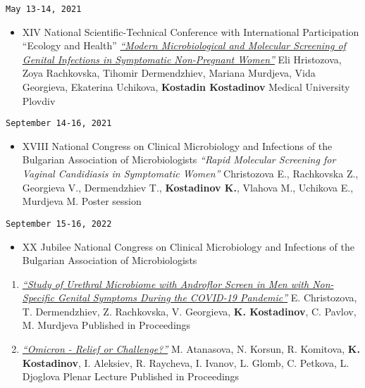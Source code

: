 \documentclass[
  12pt,
  letterpaper,
  DIV=11,
  numbers=noendperiod]{scrartcl}
\providecommand{\tightlist}{%
  \setlength{\itemsep}{0pt}\setlength{\parskip}{0pt}}\usepackage{longtable,booktabs,array}
\begin{document}
\texttt{May\ 13-14,\ 2021}

\begin{itemize}
\tightlist
\item
  XIV National Scientific-Technical Conference with International
  Participation ``Ecology and Health'' \textbar{}
  \href{https://hst.bg/ECOLOGY\%20AND\%20HEALTH\%202021.pdf}{\emph{``Modern
  Microbiological and Molecular Screening of Genital Infections in
  Symptomatic Non-Pregnant Women''}} \textbar{} Eli Hristozova, Zoya
  Rachkovska, Tihomir Dermendzhiev, Mariana Murdjeva, Vida Georgieva,
  Ekaterina Uchikova, \textbf{Kostadin Kostadinov} \textbar{} Medical
  University Plovdiv
\end{itemize}

\texttt{September\ 14-16,\ 2021}

\begin{itemize}
\tightlist
\item
  XVIII National Congress on Clinical Microbiology and Infections of the
  Bulgarian Association of Microbiologists \textbar{} \emph{``Rapid
  Molecular Screening for Vaginal Candidiasis in Symptomatic Women''}
  \textbar{} Christozova E., Rachkovska Z., Georgieva V., Dermendzhiev
  T., \textbf{Kostadinov K.}, Vlahova M., Uchikova E., Murdjeva M.
  \textbar{} Poster session
\end{itemize}

\texttt{September\ 15-16,\ 2022}

\begin{itemize}
\tightlist
\item
  XX Jubilee National Congress on Clinical Microbiology and Infections
  of the Bulgarian Association of Microbiologists
\end{itemize}

\begin{enumerate}
\def\labelenumi{\arabic{enumi}.}
\item
  \href{https://www.bam-bg.net/images/documents/3Posters.pdf}{\emph{``Study
  of Urethral Microbiome with Androflor Screen in Men with Non-Specific
  Genital Symptoms During the COVID-19 Pandemic''}} \textbar{} E.
  Christozova, T. Dermendzhiev, Z. Rachkovska, V. Georgieva, \textbf{K.
  Kostadinov}, C. Pavlov, M. Murdjeva \textbar{} Published in
  Proceedings
\item
  \href{https://www.bam-bg.net/images/documents/2Abstracts.pdf}{\emph{``Omicron
  - Relief or Challenge?''}} \textbar{} M. Atanasova, N. Korsun, R.
  Komitova, \textbf{K. Kostadinov}, I. Aleksiev, R. Raycheva, I. Ivanov,
  L. Glomb, C. Petkova, L. Djoglova \textbar{} Plenar Lecture \textbar{}
  Published in Proceedings
\end{enumerate}
\end{document}
